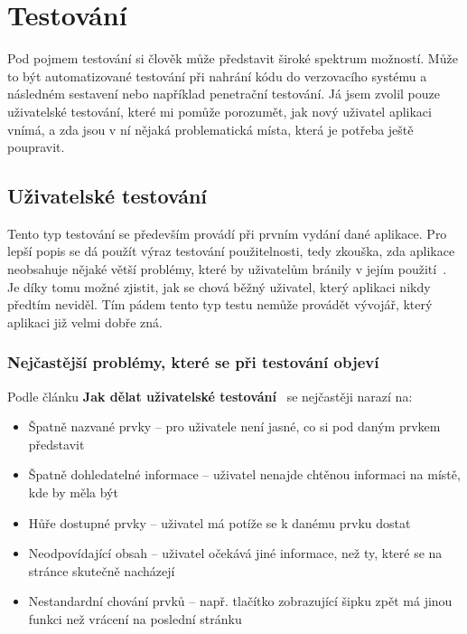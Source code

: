 
\chapter{Testování}

Pod pojmem testování si člověk může představit široké spektrum možností. Může to být automatizované testování při nahrání kódu
do verzovacího systému a následném sestavení nebo například penetrační testování. Já jsem zvolil pouze uživatelské testování,
které mi pomůže porozumět, jak nový uživatel aplikaci vnímá, a zda jsou v ní nějaká problematická místa, která je potřeba ještě
poupravit.

\section{Uživatelské testování}
Tento typ testování se především provádí při prvním vydání dané aplikace. Pro lepší popis se dá použít výraz testování použitelnosti,
tedy zkouška, zda aplikace neobsahuje nějaké větší problémy, které by uživatelům bránily v jejím použití~\cite{UserTesting}. Je díky tomu možné
zjistit, jak se chová běžný uživatel, který aplikaci nikdy předtím neviděl. Tím pádem tento typ testu nemůže provádět vývojář,
který aplikaci již velmi dobře zná.

\subsection{Nejčastější problémy, které se při testování objeví}

Podle článku \textbf{Jak dělat uživatelské testování}~\cite{UserTesting} se nejčastěji narazí na:

\begin{itemize}
    \item Špatně nazvané prvky -- pro uživatele není jasné, co si pod daným prvkem představit
    \item Špatně dohledatelné informace -- uživatel nenajde chtěnou informaci na místě, kde by měla být
    \item Hůře dostupné prvky -- uživatel má potíže se k danému prvku dostat
    \item Neodpovídající obsah -- uživatel očekává jiné informace, než ty, které se na stránce skutečně nacházejí
    \item Nestandardní chování prvků -- např. tlačítko zobrazující šipku zpět má jinou funkci než vrácení na poslední stránku
\end{itemize}

